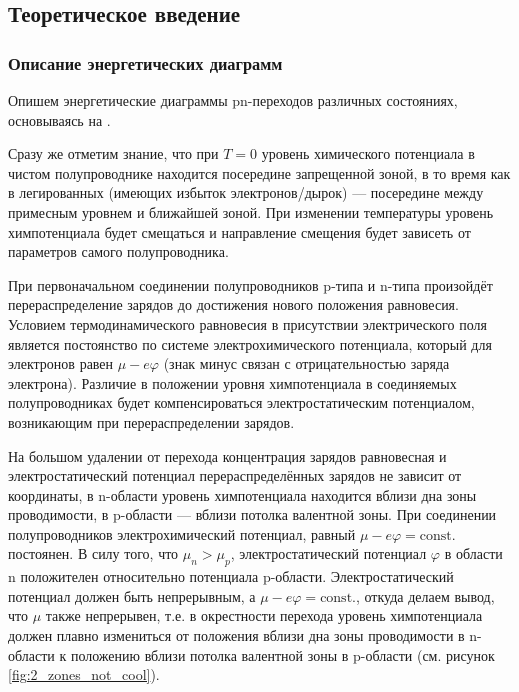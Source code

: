 \documentclass[a4paper, 12pt]{article}
\renewcommand{\phi}{\varphi} %
\begin{document}
\subsection{Теоретическое введение}

\subsubsection{Описание энергетических диаграмм}

Опишем энергетические диаграммы pn-переходов различных состояниях, основываясь на \cite{Glazkov}.

Сразу же отметим знание, что при $T = 0$ уровень химического потенциала в чистом полупроводнике находится посередине запрещенной зоной, в то время как в легированных (имеющих избыток электронов/дырок) --- посередине между примесным уровнем и ближайшей зоной. При изменении температуры уровень химпотенциала будет смещаться и направление смещения будет зависеть от параметров самого полупроводника.

При первоначальном соединении полупроводников p-типа и n-типа произойдёт перераспределение зарядов до достижения нового положения равновесия. Условием термодинамического равновесия в присутствии электрического поля является постоянство по системе электрохимического потенциала, который для электронов равен $\mu - e \phi$ (знак минус связан с отрицательностью заряда электрона). Различие в положении уровня химпотенциала в соединяемых полупроводниках будет компенсироваться электростатическим потенциалом, возникающим при перераспределении зарядов.



На большом удалении от перехода концентрация зарядов равновесная и электростатический потенциал перераспределённых зарядов не зависит от координаты, в n-области уровень химпотенциала находится вблизи дна зоны проводимости, в p-области — вблизи потолка валентной зоны. При соединении полупроводников электрохимический потенциал, равный $\mu - e\phi = \text{const.}$ постоянен. В силу того, что $\mu_n > \mu_p$, электростатический потенциал $\phi$ в области n положителен относительно потенциала p-области. Электростатический потенциал должен быть непрерывным, а $\mu - e\phi = \text{const.}$, откуда делаем вывод, что $\mu$ также непрерывен, т.е. в окрестности перехода уровень химпотенциала должен плавно измениться от положения вблизи дна зоны проводимости в n-области к положению вблизи потолка валентной зоны в p-области (см. рисунок \ref{fig:2_zones_not_cool}).
\end{document}
